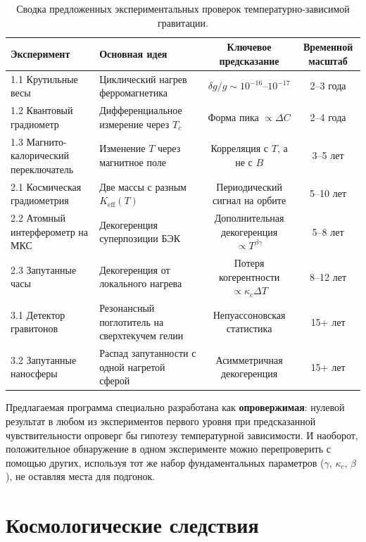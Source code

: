 \documentclass[12pt]{article}
\theoremstyle{remark}
\newcommand{\Keff}{K_{\mathrm{eff}}}
\begin{document}
	\begin{table}[htbp]
		\centering
		\caption{Сводка предложенных экспериментальных проверок температурно-зависимой гравитации.}
		\label{tab:experiment-summary}
		\small
		\begin{tabularx}{\textwidth}{l X c c}
			\toprule
			\textbf{Эксперимент} & \textbf{Основная идея} & \textbf{Ключевое предсказание} & \textbf{Временной масштаб} \\
			\midrule
			1.1 Крутильные весы & Циклический нагрев ферромагнетика & \(\delta g/g \sim 10^{-16}\)–\(10^{-17}\) & 2–3 года \\
			1.2 Квантовый градиометр & Дифференциальное измерение через \(T_c\) & Форма пика \(\propto \Delta C\) & 2–4 года \\
			1.3 Магнито-калорический переключатель & Изменение \(T\) через магнитное поле & Корреляция с \(T\), а не с \(B\) & 3–5 лет \\
			2.1 Космическая градиометрия & Две массы с разным \(\Keff(T)\) & Периодический сигнал на орбите & 5–10 лет \\
			2.2 Атомный интерферометр на МКС & Декогеренция суперпозиции БЭК & Дополнительная декогеренция \(\propto T^{\beta\gamma}\) & 5–8 лет \\
			2.3 Запутанные часы & Декогеренция от локального нагрева & Потеря когерентности \(\propto \kappa_c \Delta T\) & 8–12 лет \\
			3.1 Детектор гравитонов & Резонансный поглотитель на сверхтекучем гелии & Непуассоновская статистика & 15+ лет \\
			3.2 Запутанные наносферы & Распад запутанности с одной нагретой сферой & Асимметричная декогеренция & 15+ лет \\
			\bottomrule
		\end{tabularx}
	\end{table}
	
	Предлагаемая программа специально разработана как \textbf{опровержимая}: нулевой результат в любом из экспериментов первого уровня при предсказанной чувствительности опроверг бы гипотезу температурной зависимости. И наоборот, положительное обнаружение в одном эксперименте можно перепроверить с помощью других, используя тот же набор фундаментальных параметров (\(\gamma\), \(\kappa_c\), \(\beta\)), не оставляя места для подгонок.
	
	
	\section{Космологические следствия}
	\label{sec:cosmo}
	
\end{document}
